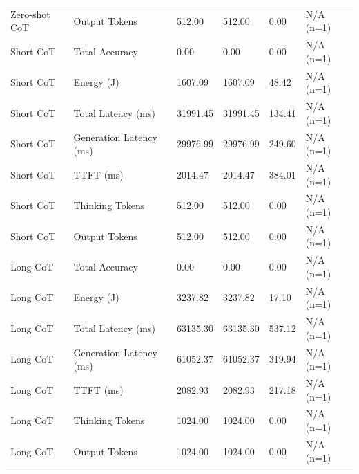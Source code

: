 \begin{table}
\begin{tabular}{llllll}
Zero-shot CoT & Output Tokens & 512.00 & 512.00 & 0.00 & N/A (n=1) \\
Short CoT & Total Accuracy & 0.00 & 0.00 & 0.00 & N/A (n=1) \\
Short CoT & Energy (J) & 1607.09 & 1607.09 & 48.42 & N/A (n=1) \\
Short CoT & Total Latency (ms) & 31991.45 & 31991.45 & 134.41 & N/A (n=1) \\
Short CoT & Generation Latency (ms) & 29976.99 & 29976.99 & 249.60 & N/A (n=1) \\
Short CoT & TTFT (ms) & 2014.47 & 2014.47 & 384.01 & N/A (n=1) \\
Short CoT & Thinking Tokens & 512.00 & 512.00 & 0.00 & N/A (n=1) \\
Short CoT & Output Tokens & 512.00 & 512.00 & 0.00 & N/A (n=1) \\
Long CoT & Total Accuracy & 0.00 & 0.00 & 0.00 & N/A (n=1) \\
Long CoT & Energy (J) & 3237.82 & 3237.82 & 17.10 & N/A (n=1) \\
Long CoT & Total Latency (ms) & 63135.30 & 63135.30 & 537.12 & N/A (n=1) \\
Long CoT & Generation Latency (ms) & 61052.37 & 61052.37 & 319.94 & N/A (n=1) \\
Long CoT & TTFT (ms) & 2082.93 & 2082.93 & 217.18 & N/A (n=1) \\
Long CoT & Thinking Tokens & 1024.00 & 1024.00 & 0.00 & N/A (n=1) \\
Long CoT & Output Tokens & 1024.00 & 1024.00 & 0.00 & N/A (n=1) \\
\bottomrule
\end{tabular}
\end{table}
